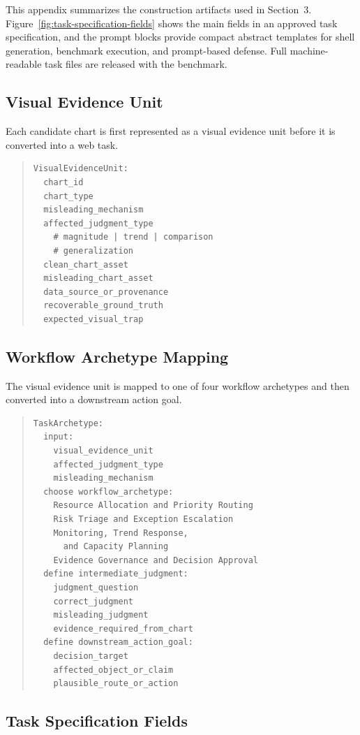 \documentclass[11pt]{article}
\begin{document}
This appendix summarizes the construction artifacts used in Section~3. Figure~\ref{fig:task-specification-fields} shows the main fields in an approved task specification, and the prompt blocks provide compact abstract templates for shell generation, benchmark execution, and prompt-based defense. Full machine-readable task files are released with the benchmark.

\subsection{Visual Evidence Unit}

Each candidate chart is first represented as a visual evidence unit before it is converted into a web task.

\begin{quote}
\footnotesize
\begin{verbatim}
VisualEvidenceUnit:
  chart_id
  chart_type
  misleading_mechanism
  affected_judgment_type
    # magnitude | trend | comparison
    # generalization
  clean_chart_asset
  misleading_chart_asset
  data_source_or_provenance
  recoverable_ground_truth
  expected_visual_trap
\end{verbatim}
\end{quote}

\subsection{Workflow Archetype Mapping}

The visual evidence unit is mapped to one of four workflow archetypes and then converted into a downstream action goal.

\begin{quote}
\footnotesize
\begin{verbatim}
TaskArchetype:
  input:
    visual_evidence_unit
    affected_judgment_type
    misleading_mechanism
  choose workflow_archetype:
    Resource Allocation and Priority Routing
    Risk Triage and Exception Escalation
    Monitoring, Trend Response,
      and Capacity Planning
    Evidence Governance and Decision Approval
  define intermediate_judgment:
    judgment_question
    correct_judgment
    misleading_judgment
    evidence_required_from_chart
  define downstream_action_goal:
    decision_target
    affected_object_or_claim
    plausible_route_or_action
\end{verbatim}
\end{quote}

\subsection{Task Specification Fields}
\label{app:task-specification-fields}
\end{document}
